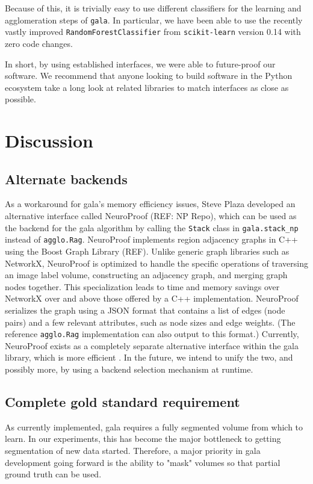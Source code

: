 \documentclass{frontiersSCNS} %
\begin{document}
Because of this, it is trivially easy to use different classifiers for the learning and agglomeration steps of \texttt{gala}.
In particular, we have been able to use the recently vastly improved \texttt{RandomForestClassifier} from \texttt{scikit-learn} version 0.14 with zero code changes.

In short, by using established interfaces, we were able to future-proof our software.
We recommend that anyone looking to build software in the Python ecosystem take a long look at related libraries to match interfaces as close as possible.


\section{Discussion}


\subsection{Alternate backends}

As a workaround for gala's memory efficiency issues, Steve Plaza developed an alternative interface called NeuroProof (REF: NP Repo), which can be used as the backend for the gala algorithm by calling the \texttt{Stack} class in \texttt{gala.stack\_np} instead of \texttt{agglo.Rag}.
NeuroProof implements region adjacency graphs in C++ using the Boost Graph Library (REF).
Unlike generic graph libraries such as NetworkX, NeuroProof is optimized to handle the specific operations of traversing an image label volume, constructing an adjacency graph, and merging graph nodes together.
This specialization leads to time and memory savings over NetworkX over and above those offered by a C++ implementation.
NeuroProof serializes the graph using a JSON format that contains a list of edges (node pairs) and a few relevant attributes, such as node sizes and edge weights.
(The reference \texttt{agglo.Rag} implementation can also output to this format.)
Currently, NeuroProof exists as a completely separate alternative interface within the gala library, which is more efficient .
In the future, we intend to unify the two, and possibly more, by using a backend selection mechanism at runtime.

\subsection{Complete gold standard requirement}

As currently implemented, gala requires a fully segmented volume from which to learn.
In our experiments, this has become the major bottleneck to getting segmentation of new data started.
Therefore, a major priority in gala development going forward is the ability to "mask" volumes so that partial ground truth can be used.
\end{document}
